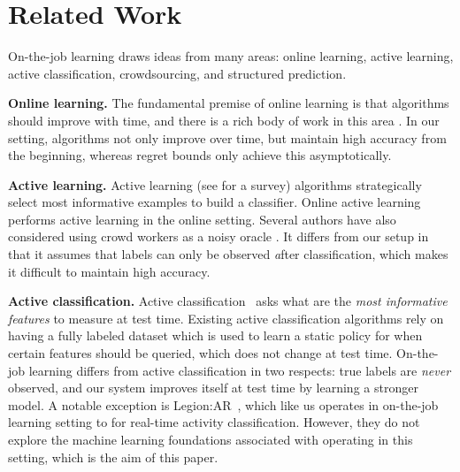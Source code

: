 \section{Related Work}
\label{sec:related}


On-the-job learning draws ideas from many areas:
online learning, active learning, active classification, crowdsourcing, and structured
prediction.


\textbf{Online learning.}
The fundamental premise of online learning is that algorithms should improve
with time, and there is a rich body of work in this area \citep{cesabianchi06prediction}.
In our setting, algorithms not only improve over time, but maintain high accuracy from the beginning,
whereas regret bounds only achieve this asymptotically.

\textbf{Active learning.}
Active learning (see \citet{settles2010active} for a survey) algorithms
strategically select most informative examples to build a classifier.
Online active learning
\citep{helmbold1997some,sculley2007online,chu2011unbiased}
performs active learning in the online setting.
Several authors have also considered using crowd workers as a noisy oracle
\citep{donmez2008proactive,golovin2010near,yan2011active,vijayanarasimhan2014large}.
It differs from our setup in that 
it assumes that labels can only be observed {\emph after} classification,
which makes it difficult to maintain high accuracy.


\textbf{Active classification.}
Active classification~\cite{greiner2002learning,chai2004test,esmeir2007anytime}
asks what are the {\em most informative features} to measure at test time.
Existing active classification algorithms rely on having a fully labeled
dataset which is used to learn a static policy for when certain features should
be queried, which does not change at test time.
On-the-job learning differs from active classification in two respects: true
labels are {\em never} observed, and our system improves itself at test
time by learning a stronger model.
A notable exception is Legion:AR~\cite{lasecki2013real},
which like us operates in on-the-job learning setting
to for real-time activity classification.
However, they do not explore the machine learning foundations associated
with operating in this setting, which is the aim of this paper.

